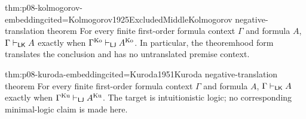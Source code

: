 \begin{hbtheorem}{thm:p08-kolmogorov-embedding}{cited=Kolmogorov1925ExcludedMiddle}{Kolmogorov negative-translation theorem}
For every finite first-order formula context \(\Gamma\) and formula \(A\),
\(\Gamma\vdash_{\mathsf{LK}}A\) exactly when
\(\Gamma^{\mathrm{Ko}}\vdash_{\mathsf{LJ}}A^{\mathrm{Ko}}\).
In particular, the theoremhood form translates the conclusion and has no
untranslated premise context.
\end{hbtheorem}

\begin{hbtheorem}{thm:p08-kuroda-embedding}{cited=Kuroda1951}{Kuroda negative-translation theorem}
For every finite first-order formula context \(\Gamma\) and formula \(A\),
\(\Gamma\vdash_{\mathsf{LK}}A\) exactly when
\(\Gamma^{\mathrm{Ku}}\vdash_{\mathsf{LJ}}A^{\mathrm{Ku}}\).
The target is intuitionistic logic; no corresponding minimal-logic claim is
made here.
\end{hbtheorem}

